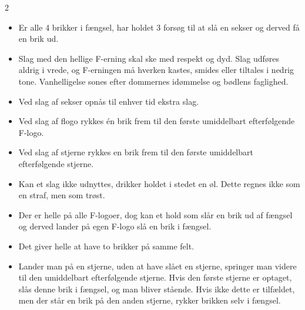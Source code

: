 \begin{multicols}{2}
    \begin{itemize}
        \item Er alle 4 brikker i fængsel, har holdet 3 forsøg til at slå en sekser og derved få en brik ud.
		\item Slag med den hellige F-erning skal ske med respekt og dyd. Slag udføres aldrig i vrede, og F-erningen må hverken kastes, smides eller tiltales i nedrig tone. Vanhelligelse sones efter dommernes idømmelse og bødlens faglighed.
		\item Ved slag af sekser opnås til enhver tid ekstra slag.
		\item Ved slag af flogo rykkes én brik frem til den første umiddelbart efterfølgende F-logo.
		\item Ved slag af stjerne rykkes en brik frem til den første umiddelbart efterfølgende stjerne.
		\item Kan et slag ikke udnyttes, drikker holdet i stedet en øl. Dette regnes ikke som en straf, men som trøst.
		\item Der er helle på alle F-logoer, dog kan et hold som slår en brik ud af fængsel og derved lander på egen F-logo slå en brik i fængsel.
		\item Det giver helle at have to brikker på samme felt.
		\item Lander man på en stjerne, uden at have slået en stjerne, springer man videre til den umiddelbart efterfølgende stjerne. Hvis den første stjerne er optaget, slås denne brik i fængsel, og man bliver stående. Hvis ikke dette er tilfældet, men der står en brik på den anden stjerne, rykker brikken selv i fængsel.
	\end{itemize}
\end{multicols}
